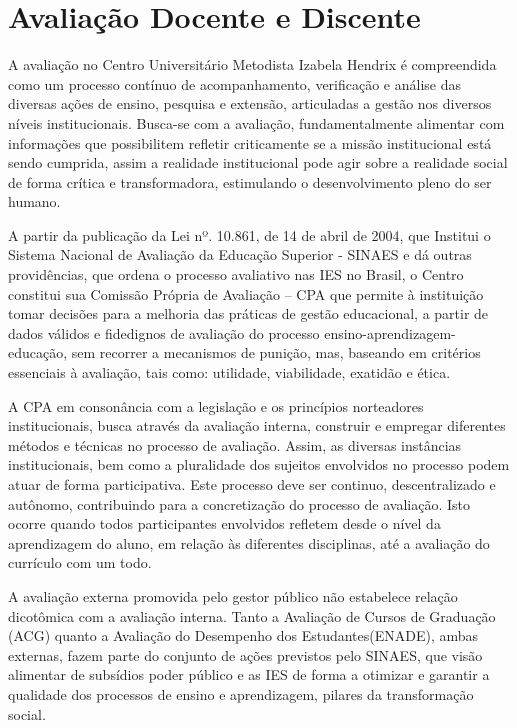 \documentclass[a4paper, 12pt, openright, oneside, german, french, english, brazil]{abntex2}
\begin{document}
\chapter{Avaliação Docente e Discente}

A avaliação no Centro Universitário Metodista Izabela Hendrix é compreendida como um processo contínuo de acompanhamento, verificação e análise das diversas ações de ensino, pesquisa e extensão, articuladas a gestão nos diversos níveis institucionais. Busca-se com a avaliação, fundamentalmente alimentar com informações que possibilitem refletir criticamente se a missão institucional está sendo cumprida, assim a realidade institucional pode agir sobre a realidade social de forma crítica e transformadora, estimulando o desenvolvimento pleno do ser humano.

A partir da publicação da Lei nº. 10.861, de 14 de abril de 2004, que Institui o Sistema Nacional de Avaliação da Educação Superior - SINAES e dá outras providências, que ordena o processo avaliativo nas IES no Brasil, o Centro constitui sua Comissão Própria de Avaliação – CPA que permite à instituição tomar decisões para a melhoria das práticas de gestão educacional, a partir de dados válidos e fidedignos de avaliação do processo ensino-aprendizagem-educação, sem recorrer a mecanismos de punição, mas, baseando em critérios essenciais à avaliação, tais como: utilidade, viabilidade, exatidão e ética.

A CPA em consonância com a legislação e os princípios norteadores institucionais, busca através da avaliação interna, construir e empregar diferentes métodos e técnicas no processo de avaliação. Assim, as diversas instâncias institucionais, bem como a pluralidade dos sujeitos envolvidos no processo podem atuar de forma participativa. Este processo deve ser continuo, descentralizado e autônomo, contribuindo para a concretização do processo de avaliação. Isto ocorre quando todos participantes envolvidos refletem desde o nível da aprendizagem do aluno, em relação às diferentes disciplinas, até a avaliação do currículo com um todo.

A avaliação externa promovida pelo gestor público não estabelece relação dicotômica com a avaliação interna. Tanto a Avaliação de Cursos de Graduação (ACG) quanto a Avaliação do Desempenho dos Estudantes(ENADE), ambas externas, fazem parte do conjunto de ações previstos pelo SINAES, que visão alimentar de subsídios poder público e as IES de forma a otimizar e garantir a qualidade dos processos de ensino e aprendizagem, pilares da transformação social.
\end{document}
